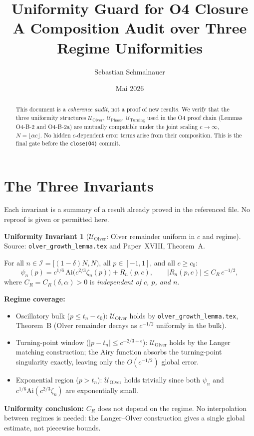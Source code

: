 \documentclass[12pt,a4paper]{amsart}
\title{Uniformity Guard for O4 Closure\\
{\normalsize A Composition Audit over Three Regime Uniformities}}
\author{Sebastian Schmalnauer}
\date{Mai 2026}
\theoremstyle{definition}
\newtheorem{invariant}[theorem]{Uniformity Invariant}
\newcommand{\Uolv}{\mathcal{U}_{\mathrm{Olver}}}
\newcommand{\Uph}{\mathcal{U}_{\mathrm{Phase}}}
\newcommand{\Utp}{\mathcal{U}_{\mathrm{Turning}}}
\newcommand{\abs}[1]{\left|#1\right|}
\begin{document}
\maketitle

\begin{abstract}
This document is a \emph{coherence audit}, not a proof of new results.
We verify that the three uniformity structures
$\Uolv$, $\Uph$, $\Utp$ used in the O4 proof chain
(Lemmas O4-B-2 and O4-B-2a)
are mutually compatible under the joint scaling
$c \to \infty$, $N = \lfloor\alpha c\rfloor$.
No hidden $c$-dependent error terms arise from their composition.
This is the final gate before the \texttt{close(O4)} commit.
\end{abstract}

\tableofcontents

\section{The Three Invariants}
\label{sec:invariants}

Each invariant is a summary of a result already proved
in the referenced file. No reproof is given or permitted here.

\begin{invariant}[$\Uolv$: Olver remainder uniform in $c$ and regime]
\label{inv:olver}
Source: \texttt{olver\_growth\_lemma.tex} and Paper~XVIII, Theorem~A.

\medskip
For all $n \in \mathcal{I} = [(1-\delta)N, N)$,
all $p \in [-1,1]$, and all $c \geq c_0$:
\[
  \psi_n(p) = c^{1/6}\,\mathrm{Ai}\bigl(c^{2/3}\zeta_n(p)\bigr) + R_n(p,c),
  \qquad
  \abs{R_n(p,c)} \leq C_R\, c^{-1/2},
\]
where $C_R = C_R(\delta,\alpha) > 0$ is \emph{independent of $c$, $p$, and $n$}.

\medskip
\noindent\textbf{Regime coverage:}
\begin{itemize}
  \item Oscillatory bulk ($p \leq t_n - \epsilon_0$):
        $\Uolv$ holds by \texttt{olver\_growth\_lemma.tex}, Theorem~B
        (Olver remainder decays as $c^{-1/2}$ uniformly in the bulk).
  \item Turning-point window ($|p - t_n| \leq c^{-2/3+\epsilon}$):
        $\Uolv$ holds by the Langer matching construction;
        the Airy function absorbs the turning-point singularity
        exactly, leaving only the $O(c^{-1/2})$ global error.
  \item Exponential region ($p > t_n$):
        $\Uolv$ holds trivially since both $\psi_n$ and
        $c^{1/6}\mathrm{Ai}(c^{2/3}\zeta_n)$ are exponentially small.
\end{itemize}

\medskip
\noindent\textbf{Uniformity conclusion:}
$C_R$ does not depend on the regime.
No interpolation between regimes is needed:
the Langer--Olver construction gives a single
global estimate, not piecewise bounds.
\end{invariant}
\end{document}
